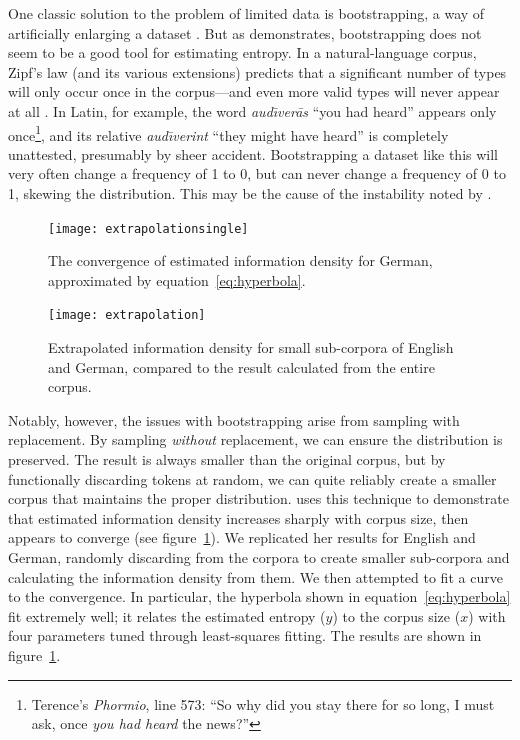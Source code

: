 \documentclass[12pt,twoside]{article}
\begin{document}
One classic solution to the problem of limited data is bootstrapping, a way of artificially enlarging a dataset \citep{oh,efron}. But as \citet[55-56]{oh} demonstrates, bootstrapping does not seem to be a good tool for estimating entropy. In a natural-language corpus, Zipf's law (and its various extensions) predicts that a significant number of types will only occur once in the corpus---and even more valid types will never appear at all \citep{davis}. In Latin, for example, the word \emph{aud\=\i{}ver\=as} ``you had heard'' appears only once\footnote{Terence's \emph{Phormio}, line 573: ``So why did you stay there for so long, I must ask, once \emph{you had heard} the news?''}, and its relative \emph{aud\=\i{}verint} ``they might have heard'' is completely unattested, presumably by sheer accident. Bootstrapping a dataset like this will very often change a frequency of 1 to 0, but can never change a frequency of 0 to 1, skewing the distribution. This may be the cause of the instability noted by \citet[56]{oh}.

\begin{figure}[h]
\centering
\noindent\texttt{[image: extrapolationsingle]}
\caption{The convergence of estimated information density for German, approximated by equation~\ref{eq:hyperbola}.}
\label{fig:exsingle}
\end{figure}

\begin{figure}[h]
\centering
\noindent\texttt{[image: extrapolation]}
\caption{Extrapolated information density for small sub-corpora of English and German, compared to the result calculated from the entire corpus.}
\label{fig:exdouble}
\end{figure}

Notably, however, the issues with bootstrapping arise from sampling with replacement. By sampling \emph{without} replacement, we can ensure the distribution is preserved. The result is always smaller than the original corpus, but by functionally discarding tokens at random, we can quite reliably create a smaller corpus that maintains the proper distribution. \citet[57]{oh} uses this technique to demonstrate that estimated information density increases sharply with corpus size, then appears to converge (see figure~\ref{fig:exsingle}). We replicated her results for English and German, randomly discarding from the corpora to create smaller sub-corpora and calculating the information density from them. We then attempted to fit a curve to the convergence. In particular, the hyperbola shown in equation~\ref{eq:hyperbola} fit extremely well; it relates the estimated entropy (\(y\)) to the corpus size (\(x\)) with four parameters tuned through least-squares fitting. The results are shown in figure~\ref{fig:exsingle}.
\end{document}
